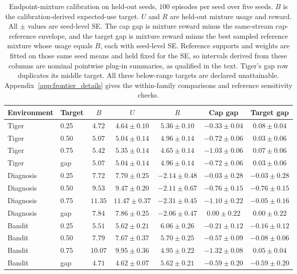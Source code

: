 \documentclass[manuscript, screen, review]{jair}
\newcommand{\tablefontsize}{\fontsize{9}{11}\selectfont\setlength{\tabcolsep}{3pt}}
\begin{document}
\begin{table}[t]
\centering
\caption{Endpoint-mixture calibration on held-out seeds, $100$ episodes per seed over five seeds. $B$ is the calibration-derived expected-use target. $U$ and $R$ are held-out mixture usage and reward. All $\pm$ values are seed-level SE. The cap gap is mixture reward minus the same-stream cap-reference envelope, and the target gap is mixture reward minus the best sampled reference mixture whose usage equals $B$, each with seed-level SE. Reference supports and weights are fitted on those same seed means and held fixed for the SE, so intervals derived from these columns are nominal pointwise plug-in summaries, as qualified in the text. Tiger's gap row duplicates its middle target. All three below-range targets are declared unattainable. Appendix~\ref{app:frontier_details} gives the within-family comparisons and reference sensitivity checks.}
\label{tab:budget_frontier_main}
\tablefontsize
\setlength{\tabcolsep}{3pt}
\begin{tabular}{@{}llccccc@{}}
\toprule
Environment & Target & $B$ & $U$ & $R$ & Cap gap & Target gap \\
\midrule
Tiger & 0.25 & $4.72$ & $4.64 \pm 0.10$ & $5.36 \pm 0.10$ & $-0.33 \pm 0.04$ & $0.08 \pm 0.04$ \\
Tiger & 0.50 & $5.07$ & $5.04 \pm 0.14$ & $4.96 \pm 0.14$ & $-0.72 \pm 0.06$ & $0.03 \pm 0.06$ \\
Tiger & 0.75 & $5.42$ & $5.35 \pm 0.14$ & $4.65 \pm 0.14$ & $-1.03 \pm 0.06$ & $0.07 \pm 0.06$ \\
Tiger & gap & $5.07$ & $5.04 \pm 0.14$ & $4.96 \pm 0.14$ & $-0.72 \pm 0.06$ & $0.03 \pm 0.06$ \\
\midrule
Diagnosis & 0.25 & $7.72$ & $7.70 \pm 0.25$ & $-2.14 \pm 0.48$ & $-0.03 \pm 0.28$ & $-0.03 \pm 0.28$ \\
Diagnosis & 0.50 & $9.53$ & $9.47 \pm 0.20$ & $-2.11 \pm 0.67$ & $-0.76 \pm 0.15$ & $-0.76 \pm 0.15$ \\
Diagnosis & 0.75 & $11.35$ & $11.47 \pm 0.37$ & $-2.31 \pm 0.45$ & $-1.10 \pm 0.22$ & $-0.05 \pm 0.16$ \\
Diagnosis & gap & $7.84$ & $7.86 \pm 0.25$ & $-2.06 \pm 0.47$ & $0.00 \pm 0.22$ & $0.00 \pm 0.22$ \\
\midrule
Bandit & 0.25 & $5.51$ & $5.62 \pm 0.21$ & $6.06 \pm 0.26$ & $-0.21 \pm 0.12$ & $-0.16 \pm 0.12$ \\
Bandit & 0.50 & $7.79$ & $7.67 \pm 0.37$ & $5.70 \pm 0.25$ & $-0.57 \pm 0.09$ & $-0.08 \pm 0.06$ \\
Bandit & 0.75 & $10.07$ & $9.95 \pm 0.36$ & $4.95 \pm 0.22$ & $-1.32 \pm 0.08$ & $0.05 \pm 0.04$ \\
Bandit & gap & $4.71$ & $4.62 \pm 0.07$ & $5.62 \pm 0.21$ & $-0.59 \pm 0.20$ & $-0.59 \pm 0.20$ \\
\bottomrule
\end{tabular}
\end{table}
\end{document}
